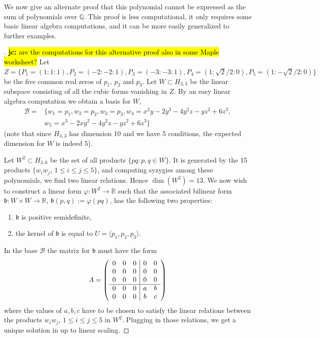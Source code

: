 \documentclass[a4paper,11pt]{amsart}%
\newcommand\jc[1]{\hl{{\bf jc:} #1}}
\newcommand\Q{\mathbb{Q}}
\newcommand\R{\mathbb{R}}
\theoremstyle{definition}
\begin{document}
We now give an alternate proof that this polynomial cannot be expressed as the sum of polynomials over $\Q$. This proof is less computational, it only requires some basic linear algebra computations, and it can be more easily generalized to further examples.

\begin{proof}[]
\jc{are the computations for this alternative proof also in some Maple worksheet?}
Let $Z = \{P_1 =(1:1:1), P_2 = (-2:-2:1), P_3 = (-3:-3:1), P_4 = (1: \sqrt 2 / 2: 0), P_5 = (1: -\sqrt 2 / 2: 0)\}$ be the five common real zeros of $p_1$, $p_2$ and $p_3$. Let $W \subset H_{3,3}$ be the linear subspace consisting of all the cubic forms vanishing in $Z$. By an easy linear algebra computation we obtain a basis for $W$,
\begin{align*}
\mathcal{B}  =  & \{w_1 = p_1, w_2 = p_2, w_3 = p_3, w_4=x^2y-2y^3-4y^2z-yz^2+6z^3,  \\
& w_5=x^3-2xy^2-4y^2z-yz^2+6z^3\}
\end{align*}
(note that since $H_{3,3}$ has dimension 10 and we have 5 conditions, the expected dimension for $W$ is indeed 5).

Let $W^2 \subset H_{3,6}$ be the set of all products $\{pq: p, q \in W\}$. It is generated by the 15 products $\{w_i w_j$, $1 \le i \le j \le 5\}$, and computing syzygies among these polynomials, we find two linear relations. Hence $\dim(W^2)=13$. We now wish to construct a linear form $\varphi: W^2 \rightarrow \R$ such that the associated bilinear form $\mathfrak{b}: W \times W \rightarrow \R$, $\mathfrak{b}(p,q) := \varphi(pq)$, has the following two properties:
\begin{enumerate}
\item $\mathfrak{b}$ is positive semidefinite,
\item the kernel of $\mathfrak{b}$ is equal to $U = \langle p_1, p_2, p_3 \rangle$.
\end{enumerate}

In the base $\mathcal{B}$ the matrix for $\mathfrak{b}$ must have the form
\[A =
\left(\begin{array}{c c c |c c}
	0 & 0 & 0 & 0 & 0 \\
	0 & 0 & 0 & 0 & 0 \\
	0 & 0 & 0 & 0 & 0 \\
	\hline
	0 & 0 & 0 & a & b \\
	0 & 0 & 0 & b & c \\
\end{array}\right)
\]
where the values of $a, b, c$ have to be chosen to satisfy the linear relations between the products $w_i w_j$, $1 \le i \le j \le 5$ in $W^2$. Plugging in those relations, we get a unique solution in up to linear scaling.


\end{proof}
\end{document}
